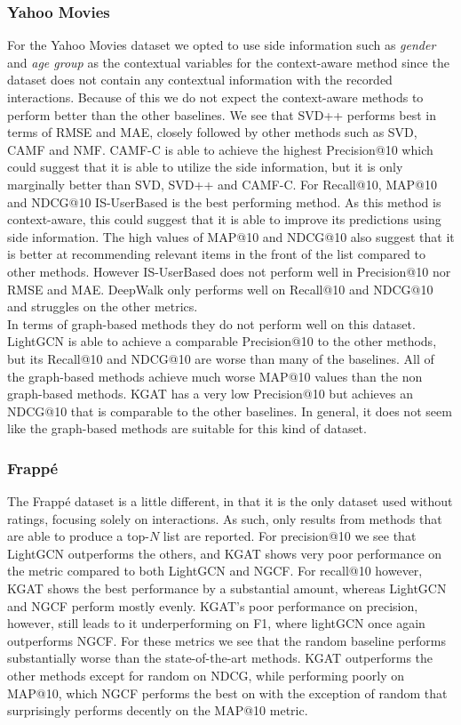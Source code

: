 \subsubsection{Yahoo Movies}
For the Yahoo Movies dataset we opted to use side information such as \textit{gender} and \textit{age group} as the contextual variables for the context-aware method since the dataset does not contain any contextual information with the recorded interactions.
Because of this we do not expect the context-aware methods to perform better than the other baselines.
We see that SVD++ performs best in terms of RMSE and MAE, closely followed by other methods such as SVD, CAMF and NMF.
CAMF-C is able to achieve the highest Precision@10 which could suggest that it is able to utilize the side information, but it is only marginally better than SVD, SVD++ and CAMF-C.
For Recall@10, MAP@10 and NDCG@10 IS-UserBased is the best performing method.
As this method is context-aware, this could suggest that it is able to improve its predictions using side information.
The high values of MAP@10 and NDCG@10 also suggest that it is better at recommending relevant items in the front of the list compared to other methods.
However IS-UserBased does not perform well in Precision@10 nor RMSE and MAE.
DeepWalk only performs well on Recall@10 and NDCG@10 and struggles on the other metrics.
\\
In terms of graph-based methods they do not perform well on this dataset.
LightGCN is able to achieve a comparable Precision@10 to the other methods, but its Recall@10 and NDCG@10 are worse than many of the baselines.
All of the graph-based methods achieve much worse MAP@10 values than the non graph-based methods.
KGAT has a very low Precision@10 but achieves an NDCG@10 that is comparable to the other baselines.
In general, it does not seem like the graph-based methods are suitable for this kind of dataset.

\subsubsection{Frappé}
The Frappé dataset is a little different, in that it is the only dataset used without ratings, focusing solely on interactions.
As such, only results from methods that are able to produce a top-$N$ list are reported.
For precision@10 we see that LightGCN outperforms the others, and KGAT shows very poor performance on the metric compared to both LightGCN and NGCF.
For recall@10 however, KGAT shows the best performance by a substantial amount, whereas LightGCN and NGCF perform mostly evenly.
KGAT's poor performance on precision, however, still leads to it underperforming on F1, where lightGCN once again outperforms NGCF.
For these metrics we see that the random baseline performs substantially worse than the state-of-the-art methods.
KGAT outperforms the other methods except for random on NDCG, while performing poorly on MAP@10, which NGCF performs the best on with the exception of random that surprisingly performs decently on the MAP@10 metric.